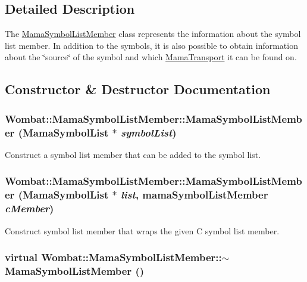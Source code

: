 \subsection{Detailed Description}
The \hyperlink{classWombat_1_1MamaSymbolListMember}{MamaSymbolListMember} class represents the information about the symbol list member. In addition to the symbols, it is also possible to obtain information about the \char`\"{}source\char`\"{} of the symbol and which \hyperlink{classWombat_1_1MamaTransport}{MamaTransport} it can be found on. 

\subsection{Constructor \& Destructor Documentation}
\hypertarget{classWombat_1_1MamaSymbolListMember_a503f49ff8ce5cfa1033bb2bd4017c972}{
\subsubsection[{MamaSymbolListMember}]{\setlength{\rightskip}{0pt plus 5cm}Wombat::MamaSymbolListMember::MamaSymbolListMember ({\bf MamaSymbolList} $\ast$ {\em symbolList})}}
\label{classWombat_1_1MamaSymbolListMember_a503f49ff8ce5cfa1033bb2bd4017c972}


Construct a symbol list member that can be added to the symbol list. \hypertarget{classWombat_1_1MamaSymbolListMember_aea2ddcc6a239f32e6b0355ec558d17f7}{
\subsubsection[{MamaSymbolListMember}]{\setlength{\rightskip}{0pt plus 5cm}Wombat::MamaSymbolListMember::MamaSymbolListMember ({\bf MamaSymbolList} $\ast$ {\em list}, \/  mamaSymbolListMember {\em cMember})}}
\label{classWombat_1_1MamaSymbolListMember_aea2ddcc6a239f32e6b0355ec558d17f7}


Construct symbol list member that wraps the given C symbol list member. \hypertarget{classWombat_1_1MamaSymbolListMember_ad80425b19885b827573ba955e232f177}{
\subsubsection[{$\sim$MamaSymbolListMember}]{\setlength{\rightskip}{0pt plus 5cm}virtual Wombat::MamaSymbolListMember::$\sim$MamaSymbolListMember ()}}
\label{classWombat_1_1MamaSymbolListMember_ad80425b19885b827573ba955e232f177}


